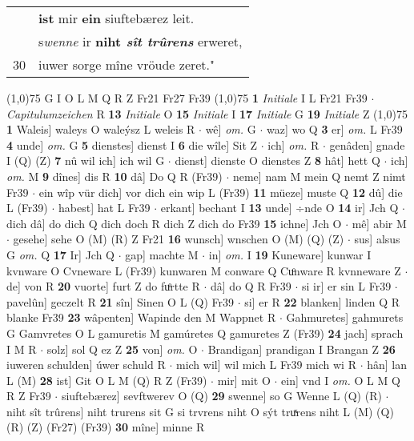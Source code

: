 \documentclass[8pt,a4paper,notitlepage]{article}
\begin{document}
\begin{table}[ht]
\begin{minipage}[t]{0.5\linewidth}
\begin{tabular}{rl}
 & \textbf{ist} mir \textbf{ein} siuftebærez leit.\\ 
 & s\textit{wenne} ir \textbf{niht \textit{sît trûrens}} erweret,\\ 
30 & iuwer sorge mîne vröude zeret."\\ 
\end{tabular}
\scriptsize
\line(1,0){75} \newline
G I O L M Q R Z Fr21 Fr27 Fr39 \newline
\line(1,0){75} \newline
\textbf{1} \textit{Initiale} I L Fr21 Fr39   $\cdot$ \textit{Capitulumzeichen} R  \textbf{13} \textit{Initiale} O  \textbf{15} \textit{Initiale} I  \textbf{17} \textit{Initiale} G  \textbf{19} \textit{Initiale} Z  \newline
\line(1,0){75} \newline
\textbf{1} Waleis] waleys O waleýsz L weleis R  $\cdot$ wê] \textit{om.} G  $\cdot$ waz] wo Q \textbf{3} er] \textit{om.} L Fr39 \textbf{4} unde] \textit{om.} G \textbf{5} dienstes] dienst I \textbf{6} die wîle] Sit Z  $\cdot$ ich] \textit{om.} R  $\cdot$ genâden] gnade I (Q) (Z) \textbf{7} nû wil ich] ich wil G  $\cdot$ dienst] dienste O dienstes Z \textbf{8} hât] hett Q  $\cdot$ ich] \textit{om.} M \textbf{9} dînes] dis R \textbf{10} dâ] Do Q R (Fr39)  $\cdot$ neme] nam M mein Q nemt Z nimt Fr39  $\cdot$ ein wîp vür dich] vor dich ein wip L (Fr39) \textbf{11} müeze] muste Q \textbf{12} dû] die L (Fr39)  $\cdot$ habest] hat L Fr39  $\cdot$ erkant] bechant I \textbf{13} unde] ÷nde O \textbf{14} ir] Jch Q  $\cdot$ dich dâ] do dich Q dich doch R dich Z dich do Fr39 \textbf{15} ichne] Jch O  $\cdot$ mê] abir M  $\cdot$ gesehe] sehe O (M) (R) Z Fr21 \textbf{16} wunsch] wnschen O (M) (Q) (Z)  $\cdot$ sus] alsus G \textit{om.} Q \textbf{17} Ir] Jch Q  $\cdot$ gap] machte M  $\cdot$ in] \textit{om.} I \textbf{19} Kuneware] kunwar I kvnware O Cvneware L (Fr39) kunwaren M conware Q Cuͦnware R kvnneware Z  $\cdot$ de] von R \textbf{20} vuorte] furt Z do fuͦrtte R  $\cdot$ dâ] do Q R Fr39  $\cdot$ si ir] er sin L Fr39  $\cdot$ pavelûn] geczelt R \textbf{21} sîn] Sinen O L (Q) Fr39  $\cdot$ si] er R \textbf{22} blanken] linden Q R blanke Fr39 \textbf{23} wâpenten] Wapinde den M Wappnet R  $\cdot$ Gahmuretes] gahmurets G Gamvretes O L gamuretis M gamúretes Q gamuretes Z (Fr39) \textbf{24} jach] sprach I M R  $\cdot$ solz] sol Q ez Z \textbf{25} von] \textit{om.} O  $\cdot$ Brandigan] prandigan I Brangan Z \textbf{26} iuweren schulden] úwer schuld R  $\cdot$ mich wil] wil mich L Fr39 mich wi R  $\cdot$ hân] lan L (M) \textbf{28} ist] Git O L M (Q) R Z (Fr39)  $\cdot$ mir] mit O  $\cdot$ ein] vnd I \textit{om.} O L M Q R Z Fr39  $\cdot$ siuftebærez] sevftwerev O (Q) \textbf{29} swenne] so G Wenne L (Q) (R)  $\cdot$ niht sît trûrens] niht trurens sit G si trvrens niht O sýt truͯrens niht L (M) (Q) (R) (Z) (Fr27) (Fr39) \textbf{30} mîne] minne R \newline

\end{minipage}
\end{table}
\end{document}
